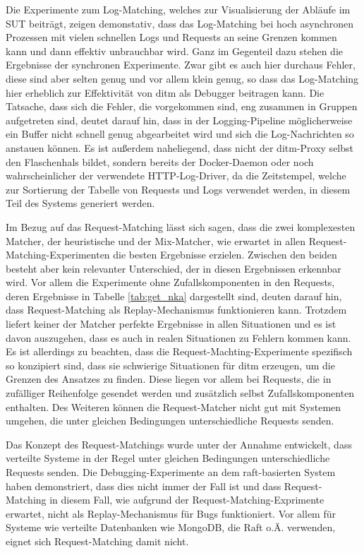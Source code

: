 \documentclass[12pt,a4paper]{report}
\begin{document}
Die Experimente zum Log-Matching, welches zur Visualisierung der Abläufe im SUT beiträgt, zeigen demonstativ, dass das
Log-Matching bei hoch asynchronen Prozessen mit vielen schnellen Logs und Requests an seine Grenzen kommen kann und dann effektiv
unbrauchbar wird. Ganz im Gegenteil dazu stehen die Ergebnisse der synchronen Experimente. Zwar gibt es auch hier durchaus Fehler,
diese sind aber selten genug und vor allem klein genug, so dass das Log-Matching hier erheblich zur Effektivität von ditm als
Debugger beitragen kann. Die Tatsache, dass sich die Fehler, die vorgekommen sind, eng zusammen in Gruppen aufgetreten sind,
deutet darauf hin, dass in der Logging-Pipeline möglicherweise ein Buffer nicht schnell genug abgearbeitet wird und sich die
Log-Nachrichten so anstauen können. Es ist außerdem naheliegend, dass nicht der ditm-Proxy selbst den Flaschenhals bildet, sondern
bereits der Docker-Daemon oder noch wahrscheinlicher der verwendete HTTP-Log-Driver, da die Zeitstempel, welche zur Sortierung der
Tabelle von Requests und Logs verwendet werden, in diesem Teil des Systems generiert werden.

Im Bezug auf das Request-Matching lässt sich sagen, dass die zwei komplexesten Matcher, der heuristische und der Mix-Matcher, wie
erwartet in allen Request-Matching-Experimenten die besten Ergebnisse erzielen. Zwischen den beiden besteht aber kein relevanter
Unterschied, der in diesen Ergebnissen erkennbar wird. Vor allem die Experimente ohne Zufallskomponenten in den Requests, deren
Ergebnisse in Tabelle \ref{tab:get_nka} dargestellt sind, deuten darauf hin, dass Request-Matching als Replay-Mechanismus
funktionieren kann. Trotzdem liefert keiner der Matcher perfekte Ergebnisse in allen Situationen und es ist davon auszugehen, dass
es auch in realen Situationen zu Fehlern kommen kann. Es ist allerdings zu beachten, dass die Request-Machting-Experimente
spezifisch so konzipiert sind, dass sie schwierige Situationen für ditm erzeugen, um die Grenzen des Ansatzes zu finden. Diese
liegen vor allem bei Requests, die in zufälliger Reihenfolge gesendet werden und zusätzlich selbst Zufallskomponenten enthalten.
Des Weiteren können die Request-Matcher nicht gut mit Systemen umgehen, die unter gleichen Bedingungen unterschiedliche Requests
senden.

Das Konzept des Request-Matchings wurde unter der Annahme entwickelt, dass verteilte Systeme in der Regel unter gleichen
Bedingungen unterschiedliche Requests senden. Die Debugging-Experimente an dem raft-basierten System haben demonstriert, dass dies
nicht immer der Fall ist und dass Request-Matching in diesem Fall, wie aufgrund der Request-Matching-Exprimente erwartet, nicht
als Replay-Mechanismus für Bugs funktioniert. Vor allem für Systeme wie verteilte Datenbanken wie MongoDB, die Raft o.Ä.
verwenden, eignet sich Request-Matching damit nicht.
\end{document}
